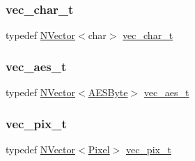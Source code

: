 \subsubsection{\texorpdfstring{vec\_char\_t}{vec\_char\_t}}
{\footnotesize\ttfamily typedef \mbox{\hyperlink{class_n_vector}{N\+Vector}}$<$char$>$ \mbox{\hyperlink{group___n_algebra_ga4be4d9f61d1c170b61a0a4bdeccac8f1}{vec\+\_\+char\+\_\+t}}}

\mbox{\label{group___n_algebra_gad347c291514f4b97d883742568d3f8a7}} 
\subsubsection{\texorpdfstring{vec\_aes\_t}{vec\_aes\_t}}
{\footnotesize\ttfamily typedef \mbox{\hyperlink{class_n_vector}{N\+Vector}}$<$\mbox{\hyperlink{class_a_e_s_byte}{A\+E\+S\+Byte}}$>$ \mbox{\hyperlink{group___n_algebra_gad347c291514f4b97d883742568d3f8a7}{vec\+\_\+aes\+\_\+t}}}

\mbox{\label{group___n_algebra_gabd4c731d10a091af31f8476c9143c453}} 
\subsubsection{\texorpdfstring{vec\_pix\_t}{vec\_pix\_t}}
{\footnotesize\ttfamily typedef \mbox{\hyperlink{class_n_vector}{N\+Vector}}$<$\mbox{\hyperlink{class_pixel}{Pixel}}$>$ \mbox{\hyperlink{group___n_algebra_gabd4c731d10a091af31f8476c9143c453}{vec\+\_\+pix\+\_\+t}}}

